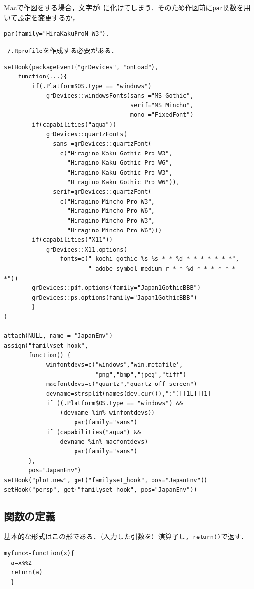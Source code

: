 \documentclass[a4paper,10pt,fleqn]{jarticle}
\begin{document}
Macで作図をする場合，文字が□に化けてしまう．そのため作図前に{\tt par}関数を用いて設定を変更するか，
\begin{screen}
\begin{verbatim}
par(family="HiraKakuProN-W3").
\end{verbatim}
\end{screen}
\verb+~/.Rprofile+を作成する必要がある．
\begin{screen}
\begin{verbatim}
setHook(packageEvent("grDevices", "onLoad"),
	function(...){
        if(.Platform$OS.type == "windows")
            grDevices::windowsFonts(sans ="MS Gothic",
                                    serif="MS Mincho",
                                    mono ="FixedFont")
        if(capabilities("aqua"))
            grDevices::quartzFonts(
              sans =grDevices::quartzFont(
                c("Hiragino Kaku Gothic Pro W3",
                  "Hiragino Kaku Gothic Pro W6",
                  "Hiragino Kaku Gothic Pro W3",
                  "Hiragino Kaku Gothic Pro W6")),
              serif=grDevices::quartzFont(
                c("Hiragino Mincho Pro W3",
                  "Hiragino Mincho Pro W6",
                  "Hiragino Mincho Pro W3",
                  "Hiragino Mincho Pro W6")))
        if(capabilities("X11"))
            grDevices::X11.options(
                fonts=c("-kochi-gothic-%s-%s-*-*-%d-*-*-*-*-*-*-*",
                        "-adobe-symbol-medium-r-*-*-%d-*-*-*-*-*-*-*"))
        grDevices::pdf.options(family="Japan1GothicBBB")
        grDevices::ps.options(family="Japan1GothicBBB")
        }
)

attach(NULL, name = "JapanEnv")
assign("familyset_hook",
       function() {
            winfontdevs=c("windows","win.metafile",
                          "png","bmp","jpeg","tiff")
            macfontdevs=c("quartz","quartz_off_screen")
            devname=strsplit(names(dev.cur()),":")[[1L]][1]
            if ((.Platform$OS.type == "windows") &&
                (devname %in% winfontdevs))
                    par(family="sans")
            if (capabilities("aqua") &&
                devname %in% macfontdevs)
                    par(family="sans")
       },
       pos="JapanEnv")
setHook("plot.new", get("familyset_hook", pos="JapanEnv"))
setHook("persp", get("familyset_hook", pos="JapanEnv"))
\end{verbatim}
\end{screen}
\subsection{関数の定義}
基本的な形式はこの形である．（入力した引数を）演算子し，{\tt return()}で返す．
\begin{screen}
\begin{verbatim}
myfunc<-function(x){
  a=x%%2
  return(a)
  }
\end{verbatim}
\end{screen}
\end{document}
